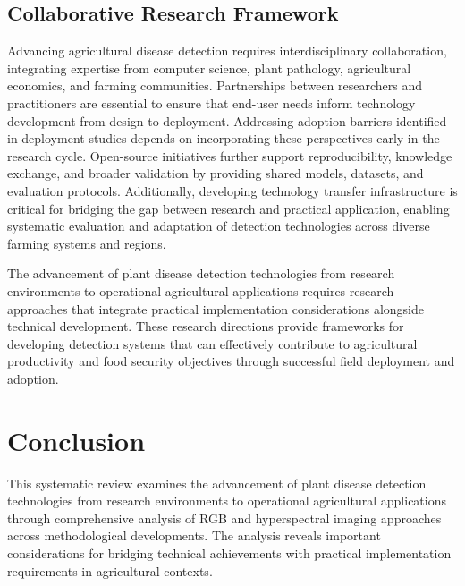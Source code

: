 \documentclass[sn-mathphys]{sn-jnl}
\theoremstyle{thmstyleone}%
\theoremstyle{thmstyletwo}%
\theoremstyle{thmstylethree}%
\begin{document}

\subsection{Collaborative Research Framework}
Advancing agricultural disease detection requires interdisciplinary collaboration, integrating expertise from computer science, plant pathology, agricultural economics, and farming communities. Partnerships between researchers and practitioners are essential to ensure that end-user needs inform technology development from design to deployment. Addressing adoption barriers identified in deployment studies depends on incorporating these perspectives early in the research cycle. Open-source initiatives further support reproducibility, knowledge exchange, and broader validation by providing shared models, datasets, and evaluation protocols. Additionally, developing technology transfer infrastructure is critical for bridging the gap between research and practical application, enabling systematic evaluation and adaptation of detection technologies across diverse farming systems and regions.

The advancement of plant disease detection technologies from research environments to operational agricultural applications requires research approaches that integrate practical implementation considerations alongside technical development. These research directions provide frameworks for developing detection systems that can effectively contribute to agricultural productivity and food security objectives through successful field deployment and adoption.

\section{Conclusion} \label{sec:conclusion}

This systematic review examines the advancement of plant disease detection technologies from research environments to operational agricultural applications through comprehensive analysis of RGB and hyperspectral imaging approaches across methodological developments. The analysis reveals important considerations for bridging technical achievements with practical implementation requirements in agricultural contexts.
\end{document}

